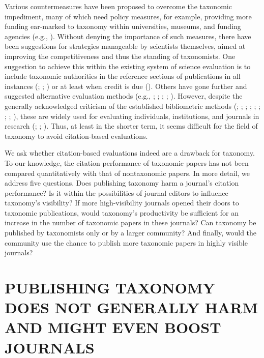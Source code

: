 \documentclass[webpdf,PV,mynatbib,surname,CE,MSC]{SYS-PV}
\begin{document}
\enlargethispage{2pt}

Various countermeasures have been proposed to overcome the taxonomic impediment, many of which
need policy measures, for example, providing more funding ear-marked to taxonomy within
universities, museums, and funding agencies (e.g., \citealt{18De2007}). Without denying the
importance of such measures, there have been suggestions for strategies manageable by scientists
themselves, aimed at improving the competitiveness and thus the standing of taxonomists. One
suggestion to achieve this within the existing system of science evaluation is to include
taxonomic authorities in the reference sections of publications in all instances
(\citealt{55Werner2006}; \citealt{8Bininda-Emonds2011}; \citealt{54Wagele2011}) or at least when
credit is due (\citealt{3Agnarsson2007}). Others have gone further and suggested alternative
evaluation methods (e.g., \citealt{34McDade2011}; \citealt{50Valdecasas2011};
\citealt{53Venu2011}; \citealt{41Schekman2013}; \citealt{39Pyke2014}). However, despite the
generally acknowledged criticism of the established bibliometric methods (\citealt{44Simons2008};
\citealt{1Adler2009}; \citealt{2Adler2009}; \citealt{37Patterson2009}; \citealt{14Brumback2012};
\citealt{23Eyre-Walker2013}; \citealt{24Foley2013}; \citealt{30Kaushal2013};
\citealt{41Schekman2013}), these are widely used for evaluating individuals, institutions, and
journals in research (\citealt{44Simons2008}; \citealt{52Vale2012}; \citealt{30Kaushal2013}).
Thus, at least in the shorter term, it seems difficult for the field of taxonomy to avoid
citation-based evaluations.

We ask whether citation-based evaluations indeed are a drawback for taxonomy. To our knowledge,
the citation performance of taxonomic papers has not been compared quantitatively with that of
nontaxonomic papers. In more detail, we address five questions. Does publishing taxonomy harm a
journal's citation performance? Is it within the possibilities of journal editors to influence
taxonomy's visibility? If more high-visibility journals opened their doors to taxonomic
publications, would taxonomy's productivity be sufficient for an increase in the number of
taxonomic papers in these journals? Can taxonomy be published by taxonomists only or by a larger
community? And finally, would the community use the chance to publish more taxonomic papers in
highly visible journals?

\enlargethispage{-1pt}

\section*{P{\sc UBLISHING} T{\sc AXONOMY} D{\sc OES} N{\sc OT} G{\sc ENERALLY} H{\sc ARM
AND} M{\sc IGHT} E{\sc VEN} B{\sc OOST} J{\sc OURNALS}}
\end{document}
